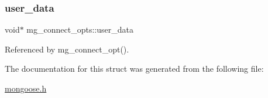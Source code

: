 \subsubsection{\texorpdfstring{user\+\_\+data}{user\_data}}
{\footnotesize\ttfamily void$\ast$ mg\+\_\+connect\+\_\+opts\+::user\+\_\+data}



Referenced by mg\+\_\+connect\+\_\+opt().



The documentation for this struct was generated from the following file\+:\begin{DoxyCompactItemize}
\item 
\hyperlink{mongoose_8h}{mongoose.\+h}\end{DoxyCompactItemize}
